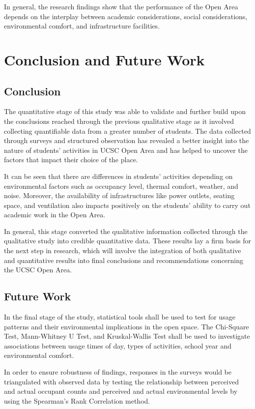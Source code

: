 \documentclass[12pt, a4paper]{report}
\begin{document}
In general, the research findings show that the performance of the Open Area depends on the interplay between academic considerations, social considerations, environmental comfort, and infrastructure facilities.

\chapter{Conclusion and Future Work}

\section{Conclusion}

The quantitative stage of this study was able to validate and further build upon the conclusions reached through the previous qualitative stage as it involved collecting quantifiable data from a greater number of students. The data collected through surveys and structured observation has revealed a better insight into the nature of students' activities in UCSC Open Area and has helped to uncover the factors that impact their choice of the place.

It can be seen that there are differences in students' activities depending on environmental factors such as occupancy level, thermal comfort, weather, and noise. Moreover, the availability of infrastructures like power outlets, seating space, and ventilation also impacts positively on the students' ability to carry out academic work in the Open Area.

In general, this stage converted the qualitative information collected through the qualitative study into credible quantitative data. These results lay a firm basis for the next step in research, which will involve the integration of both qualitative and quantitative results into final conclusions and recommendations concerning the UCSC Open Area.

\section{Future Work}
In the final stage of the study, statistical tools shall be used to test for usage patterns and their environmental implications in the open space. The Chi-Square Test, Mann-Whitney U Test, and Kruskal-Wallis Test shall be used to investigate associations between usage times of day, types of activities, school year and environmental comfort.

In order to ensure robustness of findings, responses in the surveys would be triangulated with observed data by testing the relationship between perceived and actual occupant counts and perceived and actual environmental levels by using the Spearman’s Rank Correlation method.
\end{document}
